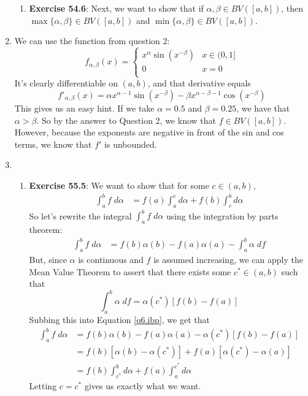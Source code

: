 \documentclass[12pt]{article}
\theoremstyle{plain}
\theoremstyle{definition}
\theoremstyle{remark}
\begin{document}
\begin{enumerate}
\begin{enumerate}
\item 
    \textbf{Exercise 54.6}: Next, we want to show that if $\alpha, \beta \in BV([a,b])$, then $\max\{\alpha, \beta\} \in BV([a,b])$ and $\min\{\alpha, \beta\} \in BV([a,b])$.

\end{enumerate} 

\item We can use the function from question 2:
    \[ 
        f_{\alpha, \beta}(x) = 
        \begin{cases}
            x^\alpha \sin(x^{-\beta}) & x\in (0, 1] \\
            0 & x=0 \\
        \end{cases}
    \]
It's clearly differentiable on $(a,b)$, and that derivative equals
\begin{equation}
        {f'}_{\alpha, \beta}(x) = \alpha x^{\alpha-1} 
            \sin(x^{-\beta}) - \beta x^{\alpha-\beta-1} \cos(x^{-\beta})
\end{equation}
This gives us an easy hint.  If we take $\alpha = 0.5$ and $\beta=0.25$, we have that $\alpha>\beta$.  So by the answer to Question 2, we know that $f\in BV([a,b])$. However, because the exponents are negative in front of the sin and cos terms, we know that $f'$ is unbounded. 
    

\item 
\begin{enumerate}
\item \textbf{Exercise 55.5}: We want to show that for some $c\in(a,b)$,
\begin{align*}
    \int^b_a f\;d\alpha &= f(a)\int^c_a d\alpha 
        + f(b) \int^b_c d\alpha 
\end{align*}
So let's rewrite the integral $\int^b_a f\;d\alpha$ using the integration by parts theorem:
\begin{align}
    \label{q6.ibp}
    \int^b_a f\;d\alpha  
        &= f(b) \alpha(b) - f(a)\alpha(a) - \int^b_a\alpha \; df
\end{align}
But, since $\alpha$ is continuous and $f$ is assumed increasing, we can apply the Mean Value Theorem to assert that there exists some $c^*\in(a,b)$ such that 
\begin{equation}
    \int^b_a \alpha\;df = \alpha(c^*)[f(b)-f(a)]
\end{equation}
Subbing this into Equation \ref{q6.ibp}, we get that
\begin{align*}
    \int^b_a f\;d\alpha  
        &= f(b) \alpha(b)-f(a)\alpha(a)-\alpha(c^*)[f(b)-f(a)]\\
        &= f(b) \left[\alpha(b)-\alpha(c^*)\right]
            + f(a)\left[\alpha(c^*)-\alpha(a)\right]\\
        &= f(b) \int^b_{c^*} d\alpha
            + f(a)\int^{c^*}_a d\alpha
\end{align*}
Letting $c=c^*$ gives us exactly what we want.



\end{enumerate}
\end{enumerate}
\end{document}
